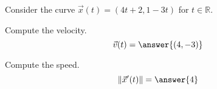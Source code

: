 \begin{problem}
Consider the curve $\vec{x}(t) = (4t+2, 1-3t)$ for $t\in\mathbb{R}$.

Compute the velocity.
\[
\vec{v}(t) = \answer{(4,-3)}
\]

Compute the speed.
\[
\|\vec{x}'(t)\| = \answer{4}
\]

\end{problem}